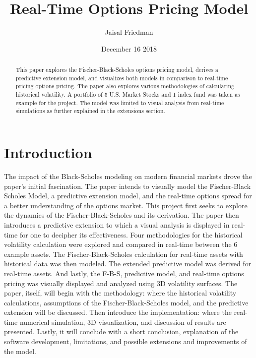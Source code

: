 \documentclass{article}
\title{Real-Time Options Pricing Model}
\author{Jaisal Friedman}
\date{December 16 2018}
\begin{document}
\maketitle


\begin{abstract}
    This paper explores the Fischer-Black-Scholes options pricing model, derives a predictive extension model, and visualizes both models in comparison to real-time pricing options pricing. The paper also explores various methodologies of calculating historical volatility. A portfolio of 5 U.S. Market Stocks and 1 index fund was taken as example for the project. The model was limited to visual analysis from real-time simulations as further explained in the extensions section. 
\end{abstract}


\section{Introduction}
\begin{flushleft} The impact of the Black-Scholes modeling on modern financial markets drove the paper's initial fascination. The paper intends to visually model the Fischer-Black Scholes Model, a predictive extension model, and the real-time options spread for a better understanding of the options market. This project first seeks to explore the dynamics of the Fischer-Black-Scholes and its derivation. The paper then introduces a predictive extension to which a visual analysis is displayed in real-time for one to decipher its effectiveness. Four methodologies for the historical volatility calculation were explored and compared in real-time between the 6 example assets. The Fischer-Black-Scholes calculation for real-time assets with historical data was then modeled. The extended predictive model was derived for real-time assets. And lastly, the F-B-S, predictive model, and real-time options pricing was visually displayed and analyzed using 3D volatility surfaces. The paper, itself, will begin with the methodology: where the historical volatility calculations, assumptions of the Fischer-Black-Scholes model, and the predictive extension will be discussed. Then introduce the implementation: where the real-time numerical simulation, 3D visualization, and discussion of results are presented. Lastly, it will conclude with a short conclusion, explanation of the software development, limitations, and possible extensions and improvements of the model.
\end{flushleft}
\end{document}
